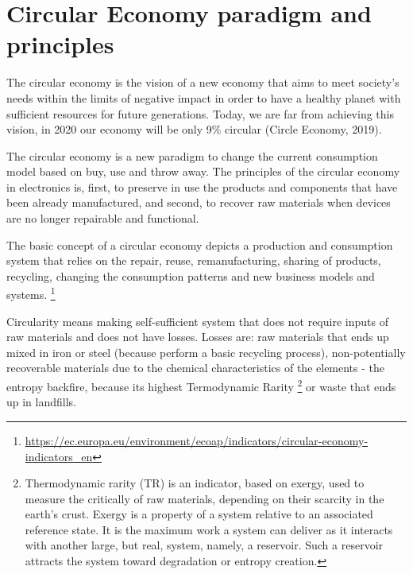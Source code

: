 \documentclass[
]{book}
\begin{document}
\hypertarget{circular-economy-paradigm-and-principles}{%
\section{Circular Economy paradigm and principles}\label{circular-economy-paradigm-and-principles}}

The circular economy is the vision of a new economy that aims to meet society's needs within the limits of negative impact in order to have a healthy planet with sufficient resources for future generations. Today, we are far from achieving this vision, in 2020 our economy will be only 9\% circular (Circle Economy, 2019).

The circular economy is a new paradigm to change the current consumption model based on buy, use and throw away. The principles of the circular economy in electronics is, first, to preserve in use the products and components that have been already manufactured, and second, to recover raw materials when devices are no longer repairable and functional.

The basic concept of a circular economy depicts a production and consumption system that relies on the repair, reuse, remanufacturing, sharing of products, recycling, changing the consumption patterns and new business models and systems. \footnote{\url{https://ec.europa.eu/environment/ecoap/indicators/circular-economy-indicators_en}}

Circularity means making self-sufficient system that does not require inputs of raw materials and does not have losses. Losses are: raw materials that ends up mixed in iron or steel (because perform a basic recycling process), non-potentially recoverable materials due to the chemical characteristics of the elements - the entropy backfire, because its highest Termodynamic Rarity \footnote{Thermodynamic rarity (TR) is an indicator, based on exergy, used to measure the critically of raw materials, depending on their scarcity in the earth's crust. Exergy is a property of a system relative to an associated reference state. It is the maximum work a system can deliver as it interacts with another large, but real, system, namely, a reservoir. Such a reservoir attracts the system toward degradation or entropy creation.} or waste that ends up in landfills.
\end{document}
